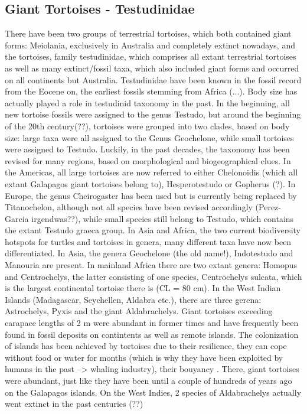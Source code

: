 

\subsection{Giant Tortoises - Testudinidae}
There have been two groups of terrestrial tortoises, which both contained giant forms: Meiolania, exclusively in Australia and completely extinct nowadays, and the tortoises, family testudinidae, which comprises all extant terrestrial tortoises as well as many extinct/fossil taxa, which also included giant forms and occurred on all continents but Australia.
Testudinidae have been known in the fossil record from the Eocene on, the earliest fossils stemming from Africa (...).
Body size has actually played a role in testudinid taxonomy in the past. In the beginning, all new tortoise fossils were assigned to the genus Testudo, but around the beginning of the 20th century(??), tortoises were grouped into two clades, based on body size: large taxa were all assigned to the Genus Geochelone, while small tortoises were assigned to Testudo.
Luckily, in the past decades, the taxonomy has been revised for many regions, based on morphological and biogeographical clues. In the Americas, all large tortoises are now referred to either Chelonoidis (which all extant Galapagos giant tortoises belong to), Hesperotestudo or Gopherus (?). In Europe, the genus Cheirogaster has been used but is currently being replaced by Titanochelon, although not all species have been revised accordingly (Perez-Garcia irgendwas??), while small species still belong to Testudo, which contains the extant Testudo graeca group. In Asia and Africa, the two current biodiversity hotspots for turtles and tortoises in genera, many different taxa have now been differentiated. In Asia, the genera Geochelone (the old name!), Indotestudo and Manouria are present. In mainland Africa there are two extant genera: Homopus and Centrochelys, the latter consisting of one species, Centrochelys sulcata, which is the largest continental tortoise there is (CL = 80 cm). In the West Indian Islands (Madagascar, Seychellen, Aldabra etc.), there are three gerena: Astrochelys, Pyxis and the giant Aldabrachelys.
Giant tortoises exceeding carapace lengths of 2 m were abundant in former times and have frequently been found in fossil deposits on contintents as well as remote islands. The colonization of islands has been achieved by tortoises due to their resilience, they can cope without food or water for months (which is why they have been exploited by humans in the past --> whaling industry), their bouyancy \citep{Gerlach2006, Patterson1973}. There, giant tortoises were abundant, just like they have been until a couple of hundreds of years ago on the Galapagos islands. On the West Indies, 2 species of Aldabrachelys actually went extinct in the past centuries (??)
